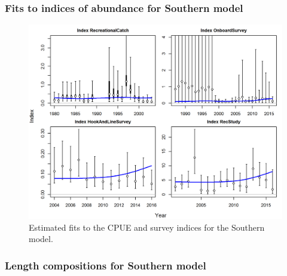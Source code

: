 \documentclass[12pt,]{article}
\begin{document}
\FloatBarrier 

\newpage

\subsubsection{Fits to indices of abundance for Southern
model}\label{fits-to-indices-of-abundance-for-southern-model}

\begin{figure}[htbp]
\centering
\includegraphics{r4ss/plots_mod2/index0_all_indices_fit.png}
\caption{Estimated fits to the CPUE and survey indices for the Southern
model. \label{fig:index_fits2}}
\end{figure}

\FloatBarrier 

\newpage

\subsubsection{Length compositions for Southern
model}\label{length-compositions-for-southern-model}
\end{document}
